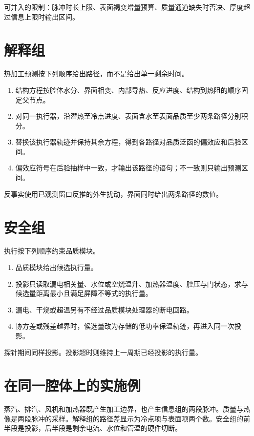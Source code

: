 可并入的限制：脉冲时长上限、表面褐变增量预算、质量通道缺失时否决、厚度超过信息上限时输出区间。

\section{解释组}

热加工预测按下列顺序给出路径，而不是给出单一剩余时间。

\begin{enumerate}
\item 结构方程按腔体水分、界面相变、内部导热、反应进度、结构到热阻的顺序固定父节点。
\item 对同一执行器，沿潜热至冷点进度、表面含水至表面品质至少两条路径分别积分。
\item 替换该执行器轨迹并保持其余方程，得到各路径对品质泛函的偏效应和后验区间。
\item 偏效应符号在后验抽样中一致，才输出该路径的语句；不一致则只输出预测区间。
\end{enumerate}

反事实使用已观测窗口反推的外生扰动，界面同时给出两条路径的数值。

\section{安全组}

执行按下列顺序约束品质模块。

\begin{enumerate}
\item 品质模块给出候选执行量。
\item 投影只读取漏电相关量、水位或空烧温升、加热器温度、腔压与门状态，求与候选量距离最小且满足屏障不等式的执行量。
\item 漏电、干烧或超温另有不经过品质模块处理器的断电回路。
\item 协方差或残差越界时，候选量改为存储的低功率保温轨迹，再进入同一次投影。
\end{enumerate}

探针期间同样投影。投影超时则维持上一周期已经投影的执行量。

\section{在同一腔体上的实施例}

蒸汽、排汽、风机和加热器既产生加工边界，也产生信息组的两段脉冲。质量与热像是两段脉冲的采样。解释组的路径差显示为冷点项与表面项两个数。安全组的前半段是投影，后半段是剩余电流、水位和管温的硬件切断。

